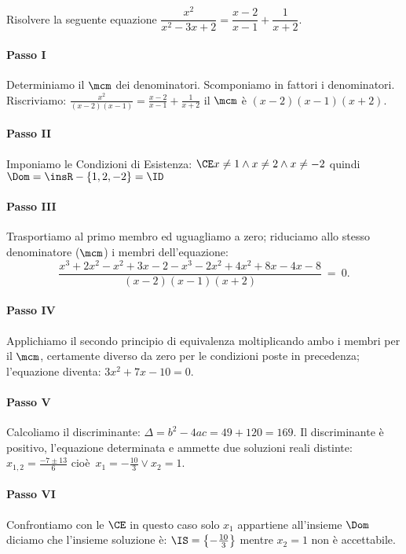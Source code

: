  \begin{esempio}
Risolvere la seguente equazione $\dfrac{x^{2}}{x^{2} - 3 x + 2}=\dfrac{x - 2}{x 
- 1} +\dfrac{1}{x + 2}$.
 \paragraph{Passo I} Determiniamo il $\mcm$ dei denominatori. Scomponiamo in 
fattori i denominatori. Riscriviamo: $\frac{x^{2}}{( x - 2 ) ( x - 1 )}=\frac{x 
- 2}{x - 1} +\frac{1}{x + 2}$ il $\mcm$ è $( x - 2 ) ( x - 1 ) ( x + 2 )$.
 \paragraph{Passo II} Imponiamo le Condizioni di Esistenza: $\CE x \neq 1 
\wedge 
x \neq 2 \wedge x \neq - 2$ quindi $\Dom = \insR - \{ 1, 2, - 2 \}=\ID$
 \paragraph{Passo III} Trasportiamo al primo membro ed uguagliamo a zero; 
riduciamo allo stesso denominatore ($\mcm$) i membri dell'equazione: 
\[\frac{x^{3} + 2 x^{2} - x^{2} + 3 x - 2 - x^{3} - 2 x^{2} + 4x^{2} + 8 x - 4 
x 
- 8}{( x - 2 ) ( x - 1 ) ( x + 2 )}~=~0.\]
 \paragraph{Passo IV} Applichiamo il secondo principio di equivalenza 
moltiplicando ambo i membri per il $\mcm$, certamente diverso da zero per le 
condizioni poste in precedenza; l'equazione diventa: $3 x^{2} + 7 x - 10 = 0$.
 \paragraph{Passo V} Calcoliamo il discriminante: $\Delta=b^{2} - 4 a c=49 + 
120=169$. Il discriminante è positivo, l'equazione determinata e ammette due 
soluzioni reali distinte: $x_{1,2}=\frac{- 7 \pm 13}{6}$ 
cioè~$x_{1}=-\frac{10}{3} \vee x_{2}=1$.
 \paragraph{Passo VI} Confrontiamo con le $\CE$ in questo caso solo $x_{1}$ 
appartiene all'insieme $\Dom$ diciamo che l'insieme soluzione è: 
$\IS=\left\{-\frac{10}{3}\right\}$ mentre $x_{2} = 1$ non è accettabile.
\end{esempio}
